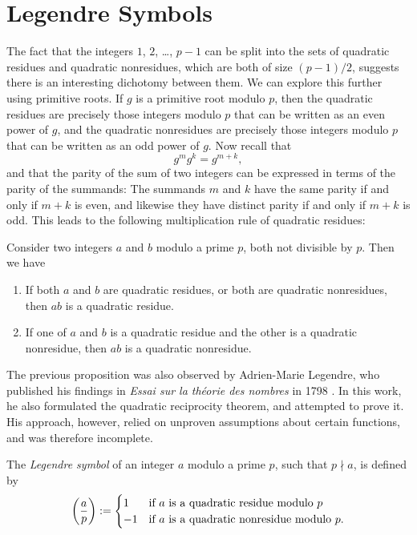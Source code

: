 \section{Legendre Symbols}

The fact that the integers $1$, $2$, \ldots, $p-1$ can be split into the sets of quadratic residues and quadratic nonresidues, which are both of size $(p-1)/2$, suggests there is an interesting dichotomy between them. We can explore this further using primitive roots. If $g$ is a primitive root modulo $p$, then the quadratic residues are precisely those integers modulo $p$ that can be written as an even power of $g$, and the quadratic nonresidues are precisely those integers modulo $p$ that can be written as an odd power of $g$. Now recall that
\begin{equation*}
  g^mg^k=g^{m+k},
\end{equation*}
and that the parity of the sum of two integers can be expressed in terms of the parity of the summands: The summands $m$ and $k$ have the same parity if and only if $m+k$ is even, and likewise they have distinct parity if and only if $m+k$ is odd. This leads to the following multiplication rule of quadratic residues:

\begin{proposition}\label{proposition:multiplicativity-quadratic-residues}
  Consider two integers $a$ and $b$ modulo a prime $p$, both not divisible by $p$. Then we have
  \begin{enumerate}
  \item If both $a$ and $b$ are quadratic residues, or both are quadratic nonresidues, then $ab$ is a quadratic residue.
  \item If one of $a$ and $b$ is a quadratic residue and the other is a quadratic nonresidue, then $ab$ is a quadratic nonresidue.
  \end{enumerate}
\end{proposition}

The previous proposition was also observed by Adrien-Marie Legendre, who published his findings in \emph{Essai sur la th\'eorie des nombres} in 1798 \cite{legendre1798}. In this work, he also formulated the quadratic reciprocity theorem, and attempted to prove it. His approach, however, relied on unproven assumptions about certain functions, and was therefore incomplete.

\begin{definition}
  The \emph{Legendre symbol} of an integer $a$ modulo a prime $p$, such that $p\nmid a$, is defined by
  \begin{equation*}
    \legendre{a}{p} :=
    \begin{cases}
      1 & \text{if $a$ is a quadratic residue modulo $p$}\\
      -1 & \text{if $a$ is a quadratic nonresidue modulo $p$.}
    \end{cases}
  \end{equation*}
\end{definition}

